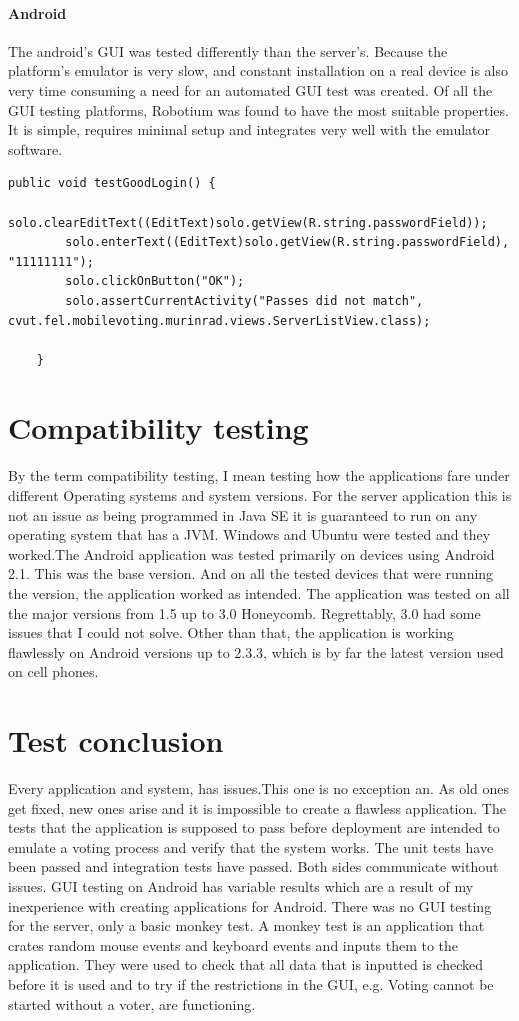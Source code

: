 \documentclass[11pt,twoside,a4paper]{book}
\begin{document}
\paragraph{Android}
The android's GUI was tested differently than the server's. Because the platform's emulator is very slow, and constant installation on a real device is also very time consuming a need for an automated GUI test was created. Of all the GUI testing platforms, Robotium was found to have the most suitable properties. It is simple, requires minimal setup and integrates very well with the emulator software. \\
\begin{lstlisting}
public void testGoodLogin() {
		solo.clearEditText((EditText)solo.getView(R.string.passwordField));
		solo.enterText((EditText)solo.getView(R.string.passwordField), "11111111");
		solo.clickOnButton("OK");
		solo.assertCurrentActivity("Passes did not match", cvut.fel.mobilevoting.murinrad.views.ServerListView.class);
		
	}
\end{lstlisting}
\section{Compatibility testing}
By the term compatibility testing, I mean testing how the applications fare under different Operating systems and system versions. For the server application this is not an issue as being programmed in Java SE it is guaranteed to run on any operating system that has a JVM. Windows and Ubuntu were tested and they worked.The Android application was tested primarily on devices using Android 2.1. This was the base version. And on all the tested devices that were running the version, the application worked as intended.  The application was tested on all the major versions from 1.5 up to 3.0 Honeycomb. Regrettably, 3.0 had some issues that I could not solve. Other than that, the application is working flawlessly on Android versions up to 2.3.3, which is by far the latest version used on cell phones.
\section{Test conclusion}
Every application and system, has issues.This one is no exception an. As old ones get fixed, new ones arise and it is impossible to create a flawless application. The tests that the application is supposed to pass before deployment are intended to emulate a voting process and verify that the system works. The unit tests have been passed and integration tests have passed. Both sides communicate without issues. GUI testing on Android has variable results which are a result of my inexperience with creating applications for Android. There was no GUI testing for the server, only a basic monkey test. A monkey test is an application that crates random mouse events and keyboard events and inputs them to the application. They were used to check that all data that is inputted is checked before it is used and to try if the restrictions in the GUI, e.g. Voting cannot be started without a voter, are functioning.
\end{document}
